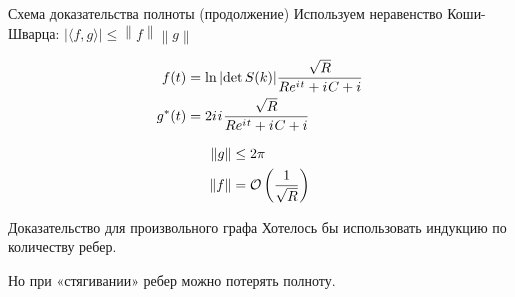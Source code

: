 \documentclass{beamer}
\newcommand{\eexp}[1]{e^{#1}}
\begin{document}
\begin{frame}{Схема доказательства полноты (продолжение)}
Используем неравенство Коши-Шварца: $\big| \langle f,g \rangle \big| \leq \left\|f\right\| \left\|g\right\|$

\begin{align*}
f(t)   &= \ln \abs{\det S(k)} \frac{\sqrt{R}}{R \eexp{\iu t} + \iu C + i} \\
g^*(t) &= 2 \iu \iu \frac{\sqrt{R}}{R \eexp{\iu t} + \iu C + i}
\end{align*}

\begin{align*}
\norm{g} &\le 2 \pi \\
\norm{f} &= \mathcal{O}\left(\frac{1}{\sqrt{R}}\right)
\end{align*}
\end{frame}

\begin{frame}{Доказательство для произвольного графа}
Хотелось бы использовать индукцию по количеству ребер.

Но при «стягивании» ребер можно потерять полноту. %
\end{frame}


\end{document}
